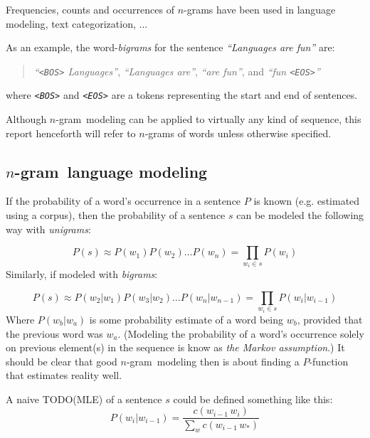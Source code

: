 \documentclass[a4paper,11pt]{kth-mag}
\newcommand{\todo}{ ... }
\newcommand{\ngram}{$n$-gram}
\newcommand{\gls}[1]{TODO(#1)}
\begin{document}
Frequencies, counts and occurrences of \ngram s have been used in language modeling\cite{chen_goodman}, text categorization\cite{ngrams}, \todo

As an example, the word-\emph{bigrams} for the sentence \emph{``Languages are fun''} are:
\begin{quote}
  \vspace*{0.1cm}
  \centering
\emph{``\texttt{<BOS>} Languages''}, \emph{``Languages are''}, \emph{``are fun''}, and \emph{``fun \texttt{<EOS>}''}
\end{quote}
where \emph{\texttt{<BOS>}} and \emph{\texttt{<EOS>}} are a tokens representing the start and end of sentences.

Although \ngram~modeling can be applied to virtually any kind of sequence, this report henceforth will refer to \ngram s of words unless otherwise specified.

\subsection{\ngram~language modeling}
If the probability of a word's occurrence in a sentence $P$ is known (e.g. estimated using a corpus), then the probability of a sentence $s$ can be modeled the following way with \emph{unigrams}:

\begin{equation} \label{eq:unigram_chain_prob}
P(s) \approx P(w_1) P(w_2) \dots P(w_n) =\prod_{w_i \in s}P(w_i)
\end{equation}
Similarly, if modeled with \emph{bigrams}:

\begin{equation} \label{eq:bigram_chain_prob}
P(s) \approx P(w_2 | w_1)P(w_3 | w_2) \dots P(w_n | w_{n-1}) = \prod_{w_i \in s}P(w_i|w_{i-1})
\end{equation}
Where $P(w_b | w_a)$ is some probability estimate of a word being $w_b$, provided that the previous word was $w_a$. (Modeling the probability of a word's occurrence solely on previous element(s) in the sequence is know as \emph{the Markov assumption}.) It should be clear that good \ngram~modeling then is about finding a $P$-function that estimates reality well.

A naive \gls{MLE} of a sentence $s$ could be defined something like this:
\begin{equation} \label{eq:bigram_mle}
P(w_i|w_{i-1}) = \frac{c(w_{i-1}\,w_i)}{\sum_{w} c(w_{i-1}\, w_*)}
\end{equation}
\end{document}
